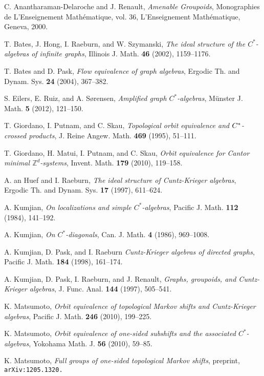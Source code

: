 \documentclass[12pt, a4paper]{amsart}
\numberwithin{equation}{section}
\theoremstyle{definition}
\theoremstyle{remark}
\begin{document}
\begin{thebibliography}{20}

 C. Anantharaman-Delaroche and J. Renault, {\em Amenable Groupoids}, Monographies de L'Enseignement Math\'ematique, vol. 36, L'Enseignement Math\'ematique, Geneva, 2000.

 T. Bates, J. Hong, I. Raeburn, and W. Szymanski, {\em The ideal structure of the $C^*$-algebras of infinite graphs},  Illinois J. Math. {\bf 46} (2002), 1159--1176.

 T. Bates and D. Pask, {\em Flow equivalence of graph algebras}, Ergodic Th. and Dynam. Sys. {\bf 24} (2004), 367--382.

 S. Eilers, E. Ruiz, and A. S{\o}rensen, {\em Amplified graph {$C^*$}-algebras}, M\"unster J. Math. {\bf 5} (2012), 121--150.

 T. Giordano, I. Putnam, and C. Skau, {\em Topological orbit equivalence and $C\sp *$-crossed products}, J. Reine Angew. Math. {\bf 469} (1995), 51--111.

 T. Giordano, H. Matui, I. Putnam, and C. Skau, {\em Orbit equivalence for Cantor minimal ${\mathbb{Z}}^d$-systems}, Invent. Math. {\bf 179} (2010), 119--158.

 A. an Huef and I. Raeburn, {\em The ideal structure of Cuntz-Krieger algebras}, Ergodic Th. and Dynam. Sys. {\bf 17} (1997), 611--624.

 A. Kumjian, {\em On localizations and simple $C^*$-algebras}, 
Pacific J. Math. {\bf 112} (1984), 141--192.

 A. Kumjian, {\em On 	$C^*$-diagonals}, Can. J. Math. {\bf 4} 
(1986), 969--1008. 

 A. Kumjian, D. Pask, and I. Raeburn {\em Cuntz-Krieger algebras of directed graphs}, Pacific J. Math. {\bf 184} (1998), 161--174.

 A. Kumjian, D. Pask, I. Raeburn, and J. Renault, {\em Graphs, 
groupoids, and Cuntz-Krieger algebras}, J. Func. Anal. {\bf 144} (1997), 
505--541.

 K. Matsumoto, {\em Orbit equivalence of topological Markov shifts and Cuntz-Krieger algebras}, Pacific J. Math. {\bf 246} (2010), 199--225.

  K. Matsumoto, {\em Orbit equivalence of one-sided subshifts and the associated $C^*$-algebras}, Yokohama Math. J. {\bf 56} (2010), 59--85.

 K. Matsumoto, {\em Full groups of one-sided topological Markov shifts}, preprint, \texttt{arXiv:1205.1320.}


\end{thebibliography}
\end{document}
